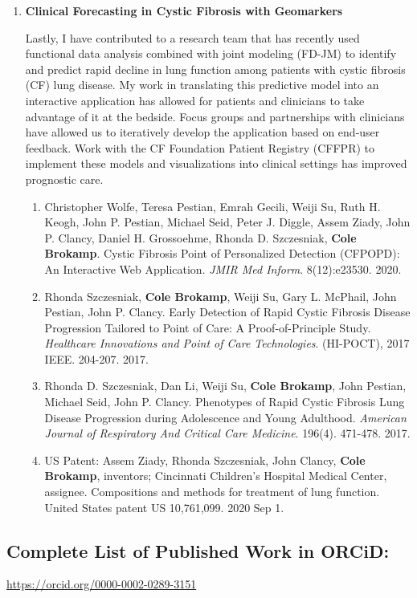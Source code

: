 \documentclass{nihbiosketch}
\begin{document}
\begin{enumerate}
\item \textbf{Clinical Forecasting in Cystic Fibrosis with Geomarkers}

  Lastly, I have contributed to a research team that has recently used
  functional data analysis combined with joint modeling (FD-JM) to identify and
  predict rapid decline in lung function among patients with cystic fibrosis
  (CF) lung disease. My work in translating this predictive model into an interactive application has allowed for patients and clinicians to take advantage of it at the bedside.  Focus groups and partnerships with clinicians have allowed us to iteratively develop the application based on end-user feedback. Work with the CF Foundation Patient Registry (CFFPR) to implement these models and visualizations into clinical settings has improved prognostic care.

\begin{enumerate}

  \item Christopher Wolfe, Teresa Pestian, Emrah Gecili, Weiji Su, Ruth H. Keogh, John P. Pestian, Michael Seid, Peter J. Diggle, Assem Ziady, John P. Clancy, Daniel H. Grossoehme, Rhonda D. Szczesniak, \textbf{Cole Brokamp}. Cystic Fibrosis Point of Personalized Detection (CFPOPD): An Interactive Web Application. \emph{JMIR Med Inform}. 8(12):e23530. 2020.

  \item Rhonda Szczesniak, \textbf{Cole Brokamp}, Weiji Su, Gary L. McPhail, John Pestian, John P. Clancy. Early Detection of Rapid Cystic Fibrosis Disease Progression Tailored to Point of Care: A Proof-of-Principle Study. \textit{Healthcare Innovations and Point of Care Technologies}. (HI-POCT), 2017 IEEE. 204-207. 2017.

  \item Rhonda D. Szczesniak, Dan Li, Weiji Su, \textbf{Cole Brokamp}, John Pestian, Michael Seid, John P. Clancy. Phenotypes of Rapid Cystic Fibrosis Lung Disease Progression during Adolescence and Young Adulthood. \textit{American Journal of Respiratory And Critical Care Medicine}. 196(4). 471-478. 2017.

\item US Patent: Assem Ziady, Rhonda Szczesniak, John Clancy, \textbf{Cole Brokamp}, inventors; Cincinnati Children's Hospital Medical Center, assignee. Compositions and methods for treatment of lung function. United States patent US 10,761,099. 2020 Sep 1.

\end{enumerate}

\end{enumerate}

\subsection*{Complete List of Published Work in ORCiD:} 
\url{https://orcid.org/0000-0002-0289-3151}
\end{document}
